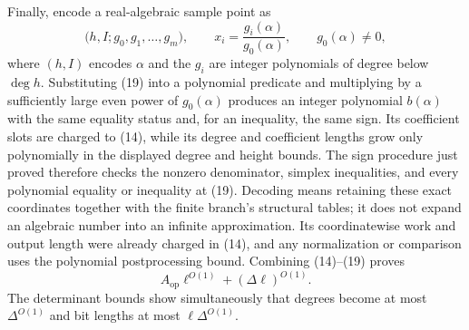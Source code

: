 Finally, encode a real-algebraic sample point as
\[
\bigl(h,I;g_0,g_1,\ldots,g_m\bigr),
\qquad
x_i=\frac{g_i(\alpha)}{g_0(\alpha)},
\qquad g_0(\alpha)\ne0,
\tag{19}
\]
where \((h,I)\) encodes \(\alpha\) and the \(g_i\) are integer polynomials of degree below \(\deg h\).  Substituting (19) into a polynomial predicate and multiplying by a sufficiently large even power of \(g_0(\alpha)\) produces an integer polynomial \(b(\alpha)\) with the same equality status and, for an inequality, the same sign.  Its coefficient slots are charged to (14), while its degree and coefficient lengths grow only polynomially in the displayed degree and height bounds.  The sign procedure just proved therefore checks the nonzero denominator, simplex inequalities, and every polynomial equality or inequality at (19).  Decoding means retaining these exact coordinates together with the finite branch's structural tables; it does not expand an algebraic number into an infinite approximation.  Its coordinatewise work and output length were already charged in (14), and any normalization or comparison uses the polynomial postprocessing bound.  Combining (14)--(19) proves
\[
A_{\mathrm{op}}\ell^{O(1)}+(\Delta\ell)^{O(1)}.
\]
The determinant bounds show simultaneously that degrees become at most \(\Delta^{O(1)}\) and bit lengths at most \(\ell\Delta^{O(1)}\).

